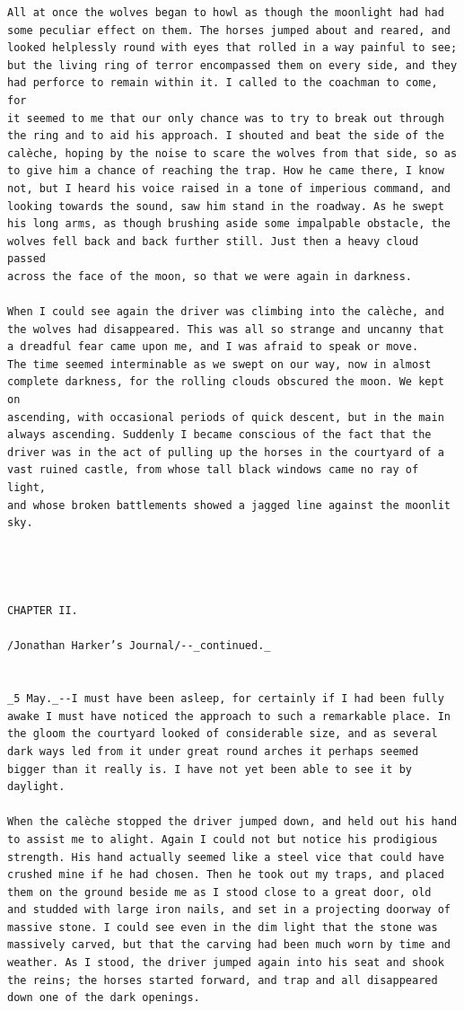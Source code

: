 \documentclass{article}
\begin{document}
\begin{verbatim}
All at once the wolves began to howl as though the moonlight had had
some peculiar effect on them. The horses jumped about and reared, and
looked helplessly round with eyes that rolled in a way painful to see;
but the living ring of terror encompassed them on every side, and they
had perforce to remain within it. I called to the coachman to come, for
it seemed to me that our only chance was to try to break out through
the ring and to aid his approach. I shouted and beat the side of the
calèche, hoping by the noise to scare the wolves from that side, so as
to give him a chance of reaching the trap. How he came there, I know
not, but I heard his voice raised in a tone of imperious command, and
looking towards the sound, saw him stand in the roadway. As he swept
his long arms, as though brushing aside some impalpable obstacle, the
wolves fell back and back further still. Just then a heavy cloud passed
across the face of the moon, so that we were again in darkness.

When I could see again the driver was climbing into the calèche, and
the wolves had disappeared. This was all so strange and uncanny that
a dreadful fear came upon me, and I was afraid to speak or move.
The time seemed interminable as we swept on our way, now in almost
complete darkness, for the rolling clouds obscured the moon. We kept on
ascending, with occasional periods of quick descent, but in the main
always ascending. Suddenly I became conscious of the fact that the
driver was in the act of pulling up the horses in the courtyard of a
vast ruined castle, from whose tall black windows came no ray of light,
and whose broken battlements showed a jagged line against the moonlit
sky.




CHAPTER II.

/Jonathan Harker’s Journal/--_continued._


_5 May._--I must have been asleep, for certainly if I had been fully
awake I must have noticed the approach to such a remarkable place. In
the gloom the courtyard looked of considerable size, and as several
dark ways led from it under great round arches it perhaps seemed
bigger than it really is. I have not yet been able to see it by
daylight.

When the calèche stopped the driver jumped down, and held out his hand
to assist me to alight. Again I could not but notice his prodigious
strength. His hand actually seemed like a steel vice that could have
crushed mine if he had chosen. Then he took out my traps, and placed
them on the ground beside me as I stood close to a great door, old
and studded with large iron nails, and set in a projecting doorway of
massive stone. I could see even in the dim light that the stone was
massively carved, but that the carving had been much worn by time and
weather. As I stood, the driver jumped again into his seat and shook
the reins; the horses started forward, and trap and all disappeared
down one of the dark openings.


\end{verbatim}
\end{document}
